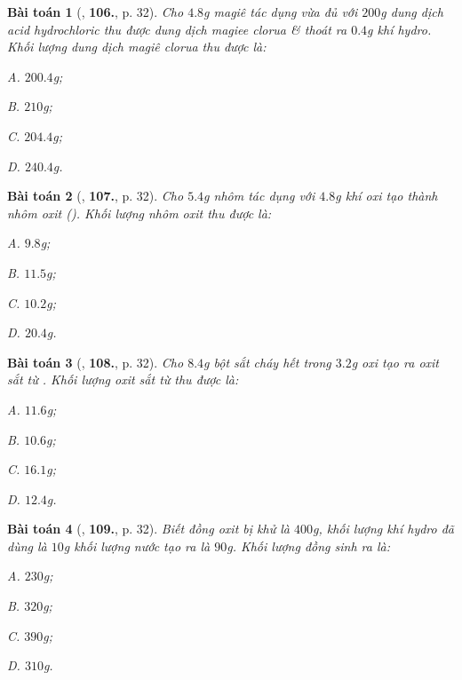 \documentclass{article}
\numberwithin{equation}{section}
\newtheorem{baitoan}{Bài toán}
\begin{document}
\begin{baitoan}[\cite{An2011}, \textbf{106.}, p. 32]
	Cho $4.8$g magiê tác dụng vừa đủ với $200$g dung dịch acid hydrochloric thu được dung dịch magiee clorua \& thoát ra $0.4$g khí hydro. Khối lượng dung dịch magiê clorua thu được là:
	\begin{enumerate*}
		\item[{\rm\sf A.}] $200.4$g;
		\item[{\rm\sf B.}] $210$g;
		\item[{\rm\sf C.}] $204.4$g;
		\item[{\rm\sf D.}] $240.4$g.
	\end{enumerate*}
\end{baitoan}

\begin{baitoan}[\cite{An2011}, \textbf{107.}, p. 32]
	Cho $5.4$g nhôm tác dụng với $4.8$g khí oxi tạo thành nhôm oxit (). Khối lượng nhôm oxit thu được là:
	\begin{enumerate*}
		\item[{\rm\sf A.}] $9.8$g;
		\item[{\rm\sf B.}] $11.5$g;
		\item[{\rm\sf C.}] $10.2$g;
		\item[{\rm\sf D.}] $20.4$g.
	\end{enumerate*}
\end{baitoan}

\begin{baitoan}[\cite{An2011}, \textbf{108.}, p. 32]
	Cho $8.4$g bột sắt cháy hết trong $3.2$g oxi tạo ra oxit sắt từ . Khối lượng oxit sắt từ thu được là:
	\begin{enumerate*}
		\item[{\rm\sf A.}] $11.6$g;
		\item[{\rm\sf B.}] $10.6$g;
		\item[{\rm\sf C.}] $16.1$g;
		\item[{\rm\sf D.}] $12.4$g.
	\end{enumerate*}
\end{baitoan}

\begin{baitoan}[\cite{An2011}, \textbf{109.}, p. 32]
	Biết đồng oxit  bị khử là $400$g, khối lượng khí hydro đã dùng là $10$g khối lượng nước tạo ra là $90$g. Khối lượng đồng sinh ra là:
	\begin{enumerate*}
		\item[{\rm\sf A.}] $230$g;
		\item[{\rm\sf B.}] $320$g;
		\item[{\rm\sf C.}] $390$g;
		\item[{\rm\sf D.}] $310$g.
	\end{enumerate*}
\end{baitoan}
\end{document}
